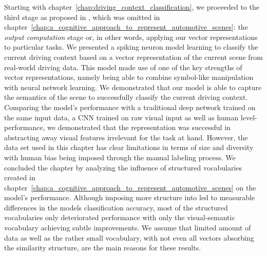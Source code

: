 Starting with chapter~\ref{chap:driving_context_classification}, we proceeded to the third stage as proposed in \textcite{Gallant2013}, which was omitted in chapter~\ref{chap:a_cognitive_approach_to_represent_automotive_scenes}: the \emph{output computation} stage or, in other words, applying our vector representations to particular tasks.
We presented a spiking neuron model learning to classify the current driving context based on a vector representation of the current scene from real-world driving data.
This model made use of one of the key strengths of vector representations, namely being able to combine symbol-like manipulation with neural network learning.
We demonstrated that our model is able to capture the semantics of the scene to successfully classify the current driving context.
Comparing the model's performance with a traditional deep network trained on the same input data, a \ac{CNN} trained on raw visual input as well as human level-performance, we demonstrated that the representation was successful in abstracting away visual features irrelevant for the task at hand.
However, the data set used in this chapter has clear limitations in terms of size and diversity with human bias being imposed through the manual labeling process.
We concluded the chapter by analyzing the influence of structured vocabularies created in chapter~\ref{chap:a_cognitive_approach_to_represent_automotive_scenes} on the model's performance. 
Although imposing more structure into led to measurable differences in the models classification accuracy, most of the structured vocabularies only deteriorated performance with only the visual-semantic vocabulary achieving subtle improvements.
We assume that limited amount of data as well as the rather small vocabulary, with not even all vectors absorbing the similarity structure, are the main reasons for these results.

